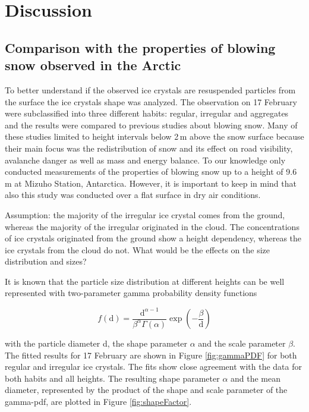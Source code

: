 \documentclass[draft,linenumbers]{agujournal}
\begin{document}
\section{Discussion}
\label{Discussion}

\subsection{Comparison with the properties of blowing snow observed in the Arctic}
To better understand if the observed ice crystals are  resuspended particles from the surface the ice crystals shape was analyzed. The observation on 17 February were subclassified into three different habits: regular, irregular and aggregates and the results were compared to previous studies about blowing snow. Many of these studies limited to height intervals below 2\,\si{m} above the snow surface because their main focus was the redistribution of snow and its effect on road visibility, avalanche danger as well as mass and energy balance. To our knowledge only \citet{Nis05} conducted measurements of the properties of blowing snow up to a height of 9.6\,\si{m} at Mizuho Station, Antarctica. However, it is important to keep in mind that also this study was conducted over a flat surface in dry air conditions. 

Assumption: the majority of the irregular ice crystal comes from the ground, whereas the majority of the irregular originated in the cloud. The concentrations of ice crystals originated from the ground show a height dependency, whereas the ice crystals from the cloud do not. What would be the effects on the size distribution and sizes?

It is known that the particle size distribution at different heights can be well represented with two-parameter gamma probability density functions \citep{Bud66, Sch82} 

\begin{linenomath*}
\begin{equation}
f(\text{d}) = \frac{\text{d}^{\alpha - 1}}{\beta^{\alpha} \Gamma\left(\alpha\right)}\exp\left(-\frac{\beta}{\text{d}}\right) 
\end{equation}
\end{linenomath*}

with the particle diameter d, the shape parameter $\alpha$ and the scale parameter $\beta$. The fitted results for 17 February are shown in Figure \ref{fig:gammaPDF} for both regular and irregular ice crystals. The fits show close agreement with the data for both habits and all heights. The resulting shape parameter $\alpha$ and the mean diameter, represented by the product of the shape and scale parameter of the gamma-pdf, are plotted in Figure \ref{fig:shapeFactor}.
\end{document}

